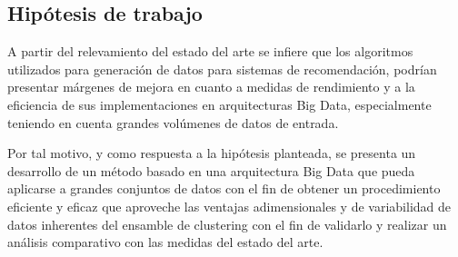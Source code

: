 \subsection{Hipótesis de trabajo}
A partir del relevamiento del estado del arte se infiere que los algoritmos utilizados para generación de datos para sistemas de recomendación, podrían presentar márgenes de mejora en cuanto a medidas de rendimiento y a la eficiencia de sus implementaciones en arquitecturas Big Data, especialmente teniendo en cuenta grandes volúmenes de datos de entrada.

\bigskip Por tal motivo, y como respuesta a la hipótesis planteada, se presenta un desarrollo de un método basado en una arquitectura Big Data que pueda aplicarse a grandes conjuntos de datos con el fin de obtener un procedimiento eficiente y eficaz que aproveche las ventajas adimensionales y de variabilidad de datos inherentes del ensamble de clustering con el fin de validarlo y realizar un análisis comparativo con las medidas del estado del arte.